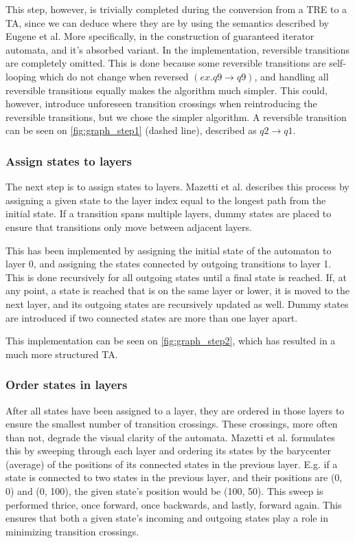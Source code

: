 This step, however, is trivially completed during the conversion from a TRE to a TA, since we can deduce where they are by using the semantics described by Eugene et al.
More specifically, in the construction of guaranteed iterator automata, and it's absorbed variant\cite{Eugene2001}.
In the implementation, reversible transitions are completely omitted. This is done because some reversible transitions are self-looping which do not change when reversed $(ex. q9\rightarrow q9)$, and handling all reversible transitions equally makes the algorithm much simpler. This could, however, introduce unforeseen transition crossings when reintroducing the reversible transitions, but we chose the simpler algorithm. A reversible transition can be seen on \cref{fig:graph_step1} (dashed line), described as $q2\rightarrow q1$.



\subsubsection{Assign states to layers}
The next step is to assign states to layers. Mazetti et al. describes this process by assigning a given state to the layer index equal to the longest path from the initial state. If a transition spans multiple layers, dummy states are placed to ensure that transitions only move between adjacent layers. \cite{Mazetti2012}

This has been implemented by assigning the initial state of the automaton to layer 0, and assigning the states connected by outgoing transitions to layer 1.
This is done recursively for all outgoing states until a final state is reached.
If, at any point, a state is reached that is on the same layer or lower, it is moved to the next layer, and its outgoing states are recursively updated as well.
Dummy states are introduced if two connected states are more than one layer apart.

This implementation can be seen on \cref{fig:graph_step2}, which has resulted in a much more structured TA.



\subsubsection{Order states in layers}
After all states have been assigned to a layer, they are ordered in those layers to ensure the smallest number of transition crossings. These crossings, more often than not, degrade the visual clarity of the automata.
Mazetti et al. formulates this by sweeping through each layer and ordering its states by the barycenter (average) of the positions of its connected states in the previous layer.
E.g. if a state is connected to two states in the previous layer, and their positions are (0, 0) and (0, 100), the given state's position would be (100, 50).
This sweep is performed thrice, once forward, once backwards, and lastly, forward again.
This ensures that both a given state's incoming and outgoing states play a role in minimizing transition crossings. \cite{Mazetti2012}

